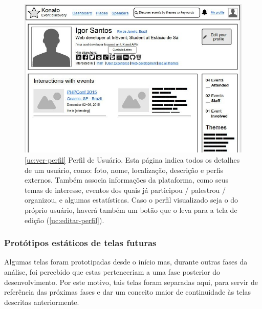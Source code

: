 \documentclass[12pt,a4paper,twoside,hyphens,english,brazil]{abntex2}
\begin{document}
{\begin{figure}[h]
\centering
	\includegraphics[width=1\linewidth]{imagens/prototipos/1-6-0_Profile.jpg}
	\caption[Perfil de Usuário]{\ref{uc:ver-perfil} Perfil de Usuário. Esta página indica todos os detalhes de um usuário, como: foto, nome, localização, descrição e perfis externos. Também associa informações da plataforma, como seus temas de interesse, eventos dos quais já participou / palestrou / organizou, e algumas estatísticas. Caso o perfil visualizado seja o do próprio usuário, haverá também um botão que o leva para a tela de edição (\ref{uc:editar-perfil}).}
	\label{prot:profile}
\end{figure}

\FloatBarrier
\subsubsection{Protótipos estáticos de telas futuras}
Algumas telas foram prototipadas desde o início mas, durante outras fases da análise, foi percebido que estas pertenceriam a uma fase posterior do desenvolvimento. Por este motivo, tais telas foram separadas aqui, para servir de referência das próximas fases e dar um conceito maior de continuidade às telas descritas anteriormente.

}
\end{document}
